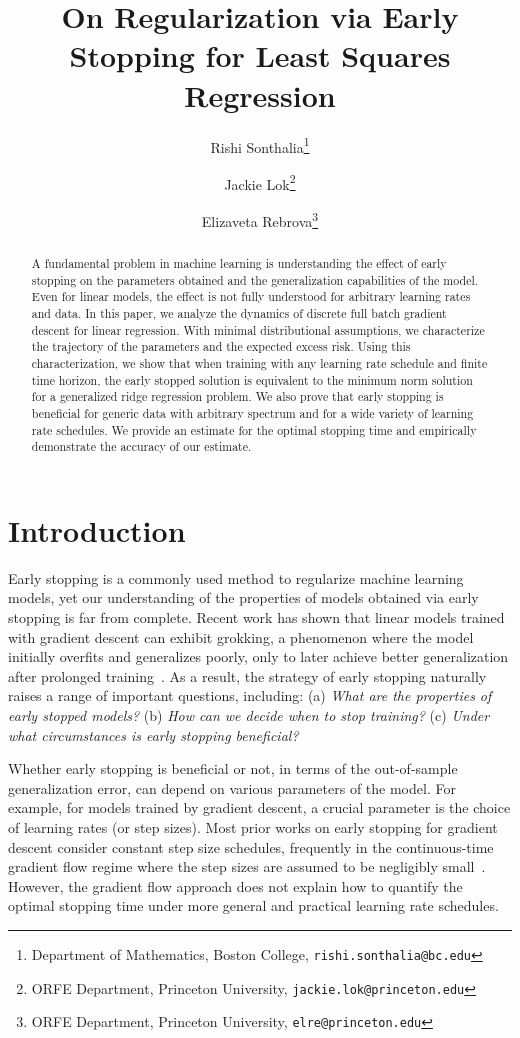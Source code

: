 \documentclass[11pt]{article}
\title{
    On Regularization via Early Stopping for Least Squares Regression
}
\author{
    Rishi Sonthalia\thanks{
        Department of Mathematics, 
        Boston College, 
        \texttt{rishi.sonthalia@bc.edu}
    }
    \and
    Jackie Lok\thanks{
        ORFE Department, 
        Princeton University, 
        \texttt{jackie.lok@princeton.edu}
    }
    \and
    Elizaveta Rebrova\thanks{
        ORFE Department, 
        Princeton University, 
        \texttt{elre@princeton.edu}
    }
}
\date{}
\begin{document}
\maketitle

\begin{abstract}
    A fundamental problem in machine learning is understanding the effect of early stopping on the parameters obtained and the generalization capabilities of the model. Even for linear models, the effect is not fully understood for arbitrary learning rates and data. In this paper, we analyze the dynamics of discrete full batch gradient descent for linear regression. With minimal distributional assumptions, we characterize the trajectory of the parameters and the expected excess risk. Using this characterization, we show that when training with any learning rate schedule and finite time horizon, the early stopped solution is equivalent to the minimum norm solution for a generalized ridge regression problem. We also prove that early stopping is beneficial for generic data with arbitrary spectrum and for a wide variety of learning rate schedules. We provide an estimate for the optimal stopping time and empirically demonstrate the accuracy of our estimate.
\end{abstract}


\section{Introduction}

Early stopping is a commonly used method to regularize machine learning models, yet our understanding of the properties of models obtained via early stopping is far from complete. Recent work has shown that linear models trained with gradient descent can exhibit grokking, a phenomenon where the model initially overfits and generalizes poorly, only to later achieve better generalization after prolonged training~\cite{levi2024grokking}. As a result, the strategy of early stopping naturally raises a range of important questions, including: (a) \emph{What are the properties of early stopped models?} (b) \emph{How can we decide when to stop training?} (c) \emph{Under what circumstances is early stopping beneficial?}

Whether early stopping is beneficial or not, in terms of the out-of-sample generalization error, can depend on various parameters of the model. For example, for models trained by gradient descent, a crucial parameter is the choice of learning rates (or step sizes). Most prior works on early stopping for gradient descent consider constant step size schedules, frequently in the continuous-time gradient flow regime where the step sizes are assumed to be negligibly small~\cite{yao2007early, raskutti2014early}. However, the gradient flow approach does not explain how to quantify the optimal stopping time under more general and practical learning rate schedules.
\end{document}
